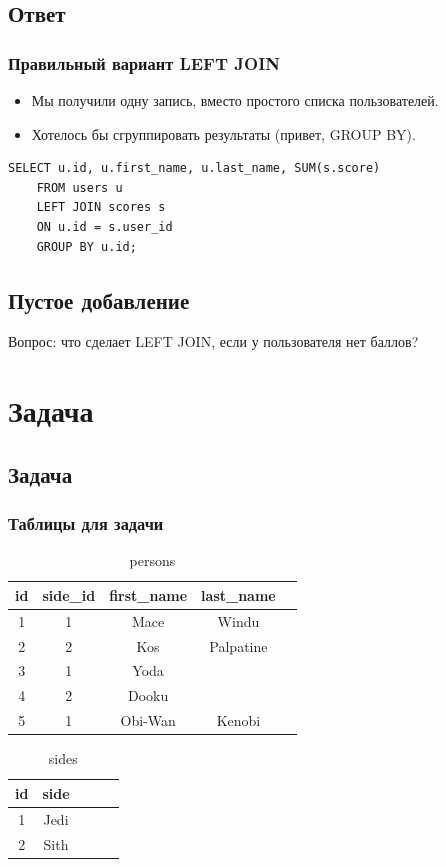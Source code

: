 \documentclass[compress,red]{beamer}
\begin{document}
\subsection{Ответ}
\begin{frame}[fragile]
  \frametitle{Правильный вариант LEFT JOIN}
  \begin{itemize}
    \item Мы получили одну запись, вместо простого списка пользователей.
    \item Хотелось бы сгруппировать результаты (привет, GROUP BY).
  \end{itemize}
  \scriptsize{
  \begin{lstlisting}[label=sql5,caption=LEFT JOIN GROUP BY]
    SELECT u.id, u.first_name, u.last_name, SUM(s.score) 
    FROM users u 
    LEFT JOIN scores s
    ON u.id = s.user_id
    GROUP BY u.id;
  \end{lstlisting}
  }
\end{frame}

\subsection{Пустое добавление}
\begin{frame}
  \begin{center}
    \Large{Вопрос: что сделает LEFT JOIN, если у пользователя нет баллов?}
  \end{center}
\end{frame}

\section{Задача}
\subsection{Задача}
\begin{frame}[fragile]
  \frametitle{Таблицы для задачи}
  \begin{table}
    \begin{tabular}{|c|c|c|c|c|}
      \hline
      id & side\_id & first\_name & last\_name \\
      \hline
      1 & 1 & Mace & Windu \\
      2 & 2 & Kos & Palpatine\\
      3 & 1 & Yoda &  \\
      4 & 2 & Dooku &  \\
      5 & 1 & Obi-Wan & Kenobi  \\
      \hline
    \end{tabular}
    \caption{persons}
  \end{table}
  \begin{table}
    \begin{tabular}{|c|c|c|c|c|}
      \hline
      id & side \\
      \hline
      1 & Jedi \\
      2 & Sith \\
      \hline
    \end{tabular}
    \caption{sides}
  \end{table}
\end{frame}
\end{document}
